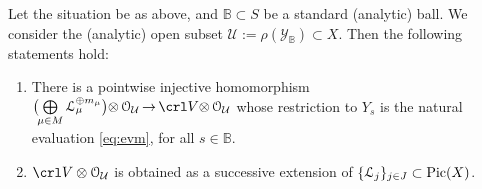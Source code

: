 \documentclass[11pt,reqno]{amsart}
\let\euf\EuScript
\let\cal\mathcal
\let\mbb\mathbb
\numberwithin{equation}{section}
\numberwithin{figure}{section}
\begin{document}
\begin{m-lemma}\label{lm:glue} 
Let the situation be as above, and ${{\mbb B}}\subset S$ be a standard (analytic) ball. 
We consider the (analytic) open subset ${{\cal U}}:=\rho({{\cal Y}}_{{\mbb B}})\subset X$. 
Then the following statements hold: 
\begin{enumerate}
\item There is a pointwise injective homomorphism 
$
{\bigl(\kern-.3ex
\underset{\mu\in M}{\mbox{$\bigoplus$}}\,
{{\euf L}}_\mu^{\oplus m_\mu}
\bigr)}
{\otimes}\,{{\euf O}}_{{\cal U}}
\,{\to}\,\crl V{\otimes}\,{{\euf O}}_{{\cal U}}
$ 
whose restriction to $Y_s$ is the natural evaluation \eqref{eq:evm}, for all $s\in{{\mbb B}}$. 

\item $\crl V\otimes{{\euf O}}_{{\cal U}}$ is obtained as a successive extension of 
$\{{{\euf L}}_j\}_{j\in J}\subset{\mathop{\rm Pic}\nolimits}(X)$. 
\end{enumerate}
\end{m-lemma}
\end{document}
